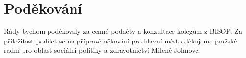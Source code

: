 \section*{Poděkování}

Rády bychom poděkovaly za cenné podněty a konzultace kolegům z BISOP.
Za příležitost podílet se na přípravě očkování pro hlavní město děkujeme pražské radní pro oblast sociální politiky a zdravotnictví Mileně Johnové.


